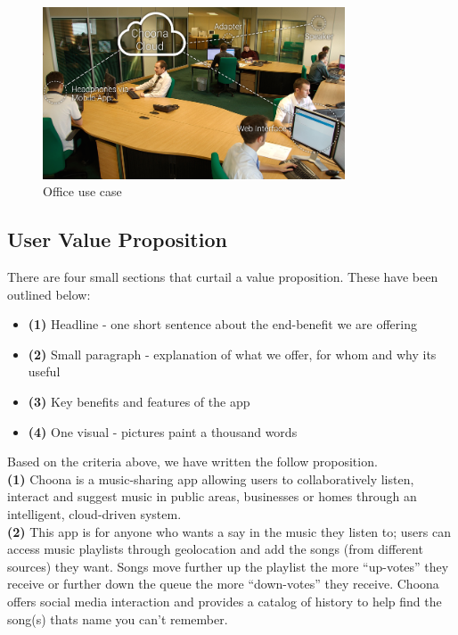     \begin{figure}[h!]
      \centering
      \includegraphics[width=0.8\textwidth]{./img/office.png}
      \caption{Office use case}
      \label{fig:office}
    \end{figure}

\subsection{User Value Proposition}
There are four small sections that curtail a value proposition.  These have been outlined below:
\begin{itemize}
\item \textbf{(1)} Headline - one short sentence about the end-benefit we are offering
\item \textbf{(2)} Small paragraph - explanation of what we offer, for whom and why its useful
\item \textbf{(3)} Key benefits and features of the app
\item \textbf{(4)} One visual - pictures paint a thousand words
\end{itemize}
Based on the criteria above, we have written the follow proposition.\\

\textbf{(1)} Choona is a music-sharing app allowing users to collaboratively listen, interact and suggest music in public areas, businesses or homes through an intelligent, cloud-driven system.  \\

\textbf{(2)} This app is for anyone who wants a say in the music they listen to; users can access music playlists through geolocation and add the songs (from different sources) they want.  Songs move further up the playlist the more ``up-votes'' they receive or further down the queue the more ``down-votes'' they receive.  Choona offers social media interaction and provides a catalog of history to help find the song(s) thats name you can't remember.  \\

